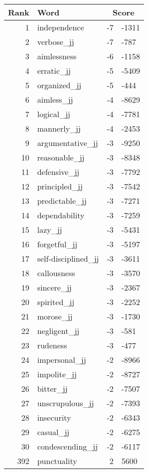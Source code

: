 \begin{longtable}[!htbp]{| rlr@{.}l |}
    \hline
    \textbf{Rank} & \textbf{Word} & \multicolumn{2}{c|}{\textbf{Score}} \\
    \hline
    \endhead
    1 & independence & -7 & -1311 \\
    2 & verbose\_jj & -7 & -787 \\
    3 & aimlessness & -6 & -1158 \\
    4 & erratic\_jj & -5 & -5409 \\
    5 & organized\_jj & -5 & -444 \\
    6 & aimless\_jj & -4 & -8629 \\
    7 & logical\_jj & -4 & -7781 \\
    8 & mannerly\_jj & -4 & -2453 \\
    9 & argumentative\_jj & -3 & -9250 \\
    10 & reasonable\_jj & -3 & -8348 \\
    11 & defensive\_jj & -3 & -7792 \\
    12 & principled\_jj & -3 & -7542 \\
    13 & predictable\_jj & -3 & -7271 \\
    14 & dependability & -3 & -7259 \\
    15 & lazy\_jj & -3 & -5431 \\
    16 & forgetful\_jj & -3 & -5197 \\
    17 & self-disciplined\_jj & -3 & -3611 \\
    18 & callousness & -3 & -3570 \\
    19 & sincere\_jj & -3 & -2367 \\
    20 & spirited\_jj & -3 & -2252 \\
    21 & morose\_jj & -3 & -1730 \\
    22 & negligent\_jj & -3 & -581 \\
    23 & rudeness & -3 & -477 \\
    24 & impersonal\_jj & -2 & -8966 \\
    25 & impolite\_jj & -2 & -8727 \\
    26 & bitter\_jj & -2 & -7507 \\
    27 & unscrupulous\_jj & -2 & -7393 \\
    28 & insecurity & -2 & -6343 \\
    29 & casual\_jj & -2 & -6275 \\
    30 & condescending\_jj & -2 & -6117 \\
    392 & punctuality & 2 & 5600 \\

\end{longtable}
